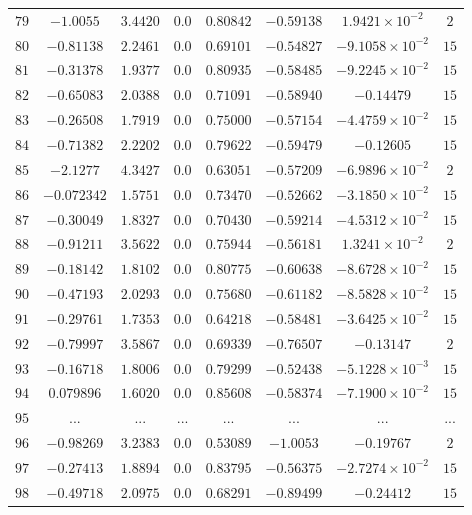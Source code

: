 \begin{landscape}
\begin{center}
\begin{longtable}{lccccccc}
$79$ & $-1.0055$ & $ 3.4420$ & $0.0$ & $ 0.80842$ & $-0.59138$ & $1.9421\times{}10^{-2}$ & $2$ \\
$80$ & $-0.81138$ & $ 2.2461$ & $0.0$ & $ 0.69101$ & $-0.54827$ & $-9.1058\times{}10^{-2}$ & $15$ \\
$81$ & $-0.31378$ & $ 1.9377$ & $0.0$ & $ 0.80935$ & $-0.58485$ & $-9.2245\times{}10^{-2}$ & $15$ \\
$82$ & $-0.65083$ & $ 2.0388$ & $0.0$ & $ 0.71091$ & $-0.58940$ & $-0.14479$ & $15$ \\
$83$ & $-0.26508$ & $ 1.7919$ & $0.0$ & $ 0.75000$ & $-0.57154$ & $-4.4759\times{}10^{-2}$ & $15$ \\
$84$ & $-0.71382$ & $ 2.2202$ & $0.0$ & $ 0.79622$ & $-0.59479$ & $-0.12605$ & $15$ \\
$85$ & $-2.1277$ & $ 4.3427$ & $0.0$ & $ 0.63051$ & $-0.57209$ & $-6.9896\times{}10^{-2}$ & $2$ \\
$86$ & $-0.072342$ & $ 1.5751$ & $0.0$ & $ 0.73470$ & $-0.52662$ & $-3.1850\times{}10^{-2}$ & $15$ \\
$87$ & $-0.30049$ & $ 1.8327$ & $0.0$ & $ 0.70430$ & $-0.59214$ & $-4.5312\times{}10^{-2}$ & $15$ \\
$88$ & $-0.91211$ & $ 3.5622$ & $0.0$ & $ 0.75944$ & $-0.56181$ & $1.3241\times{}10^{-2}$ & $2$ \\
$89$ & $-0.18142$ & $ 1.8102$ & $0.0$ & $ 0.80775$ & $-0.60638$ & $-8.6728\times{}10^{-2}$ & $15$ \\
$90$ & $-0.47193$ & $ 2.0293$ & $0.0$ & $ 0.75680$ & $-0.61182$ & $-8.5828\times{}10^{-2}$ & $15$ \\
$91$ & $-0.29761$ & $ 1.7353$ & $0.0$ & $ 0.64218$ & $-0.58481$ & $-3.6425\times{}10^{-2}$ & $15$ \\
$92$ & $-0.79997$ & $ 3.5867$ & $0.0$ & $ 0.69339$ & $-0.76507$ & $-0.13147$ & $2$ \\
$93$ & $-0.16718$ & $ 1.8006$ & $0.0$ & $ 0.79299$ & $-0.52438$ & $-5.1228\times{}10^{-3}$ & $15$ \\
$94$ & $0.079896$ & $ 1.6020$ & $0.0$ & $ 0.85608$ & $-0.58374$ & $-7.1900\times{}10^{-2}$ & $15$ \\
$95$ & ... & ... & ... & ... & ... & ... & ... \\
$96$ & $-0.98269$ & $ 3.2383$ & $0.0$ & $ 0.53089$ & $-1.0053$ & $-0.19767$ & $2$ \\
$97$ & $-0.27413$ & $ 1.8894$ & $0.0$ & $ 0.83795$ & $-0.56375$ & $-2.7274\times{}10^{-2}$ & $15$ \\
$98$ & $-0.49718$ & $ 2.0975$ & $0.0$ & $ 0.68291$ & $-0.89499$ & $-0.24412$ & $15$ \\

\end{longtable}
\end{center}
\end{landscape}
